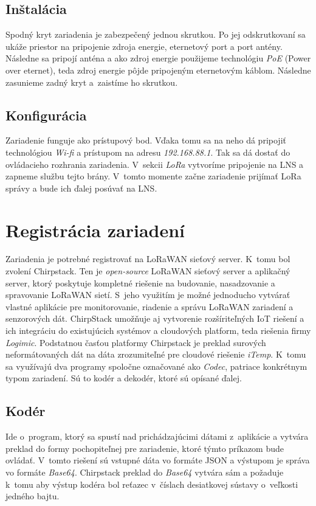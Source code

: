 \subsection*{Inštalácia}
Spodný kryt zariadenia je zabezpečený jednou skrutkou. 
Po jej odskrutkovaní sa ukáže priestor na pripojenie zdroja energie, eternetový  port a port antény. 
Následne sa pripojí anténa a ako zdroj energie použijeme technológiu \emph{PoE} (Power over eternet), teda zdroj energie pôjde pripojeným eternetovým káblom. Následne zasunieme zadný kryt a~zaistíme ho skrutkou.
\subsection*{Konfigurácia}
Zariadenie funguje ako prístupový bod. Vďaka tomu sa na neho dá pripojiť technológiou \emph{Wi-fi} a prístupom na adresu \emph{192.168.88.1}. 
Tak sa dá dostať do ovládacieho rozhrania zariadenia. V~sekcii \emph{LoRa} vytvoríme pripojenie na LNS a zapneme službu tejto brány. 
V~tomto momente začne zariadenie prijímať LoRa správy a bude ich ďalej posúvať na LNS.  


\section{Registrácia zariadení}\label{impl-Chirp}
 Zariadenia je potrebné registrovať na LoRaWAN sieťový server.
 K~tomu bol zvolení Chirpstack.
 Ten je \emph{open-source} LoRaWAN sieťový server a aplikačný server, ktorý poskytuje kompletné riešenie na budovanie, nasadzovanie a spravovanie LoRaWAN sietí. 
 S~jeho využitím je možné jednoducho vytvárať vlastné aplikácie pre monitorovanie, riadenie a správu LoRaWAN zariadení a senzorových dát.
 ChirpStack umožňuje aj vytvorenie rozšíriteľných IoT riešení a ich integráciu do existujúcich systémov a cloudových platform, teda riešenia firmy \emph{Logimic}. 
 Podstatnou časťou platformy Chirpstack je preklad surových neformátovaných dát na dáta zrozumiteľné pre cloudové riešenie \emph{iTemp}. 
 K~tomu sa využívajú dva programy spoločne označované ako \emph{Codec}, patriace konkrétnym typom zariadení. Sú to kodér a dekodér, ktoré sú opísané ďalej.
\subsection*{Kodér}
Ide o~program, ktorý sa spustí nad prichádzajúcimi dátami z~aplikácie a vytvára preklad do formy pochopiteľnej pre zariadenie, ktoré týmto príkazom bude ovládať. V~tomto riešení sú vstupné dáta vo formáte JSON a výstupom je správa vo formáte \emph{Base64}. Chirpstack preklad do \emph{Base64} vytvára sám a požaduje k~tomu aby výstup kodéra bol reťazec v~číslach desiatkovej sústavy o~veľkosti jedného bajtu.

